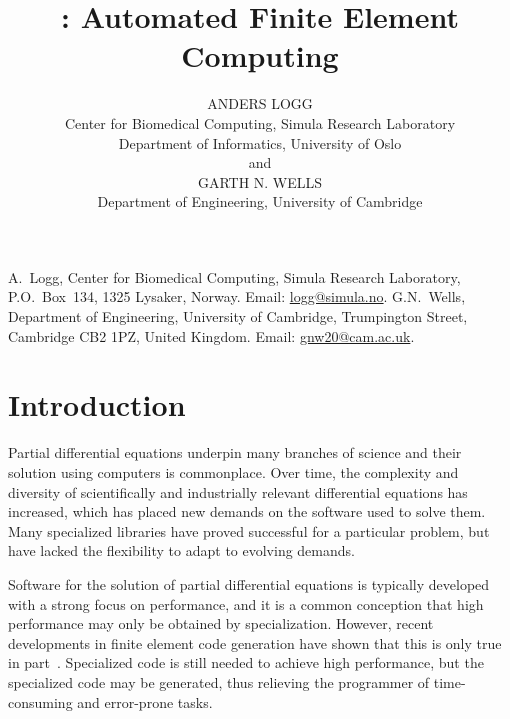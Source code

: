 \documentclass[acmtoms]{acmtrans2m}
\title{\dolfin{}: Automated Finite Element Computing}
\author{ANDERS LOGG \\
        Center for Biomedical Computing, Simula Research Laboratory \\
        Department of Informatics, University of Oslo \\
        and \\
        GARTH N. WELLS \\
        Department of Engineering, University of Cambridge}
\begin{document}
\begin{bottomstuff}
  A.~Logg,
  Center for Biomedical Computing,
  Simula Research Laboratory,
  P.O.~Box~134, 1325 Lysaker, Norway.
  Email: \url{logg@simula.no}.
  \newline
  G.N.~Wells, Department of Engineering, University of Cambridge,
  Trumpington Street, Cambridge CB2 1PZ, United Kingdom.
  Email: \url{gnw20@cam.ac.uk}.
\end{bottomstuff}

\maketitle

\section{Introduction}
\label{sec:introduction}

Partial differential equations underpin many branches of science and
their solution using computers is commonplace. Over time, the
complexity and diversity of scientifically and industrially relevant
differential equations has increased, which has placed new demands on
the software used to solve them. Many specialized libraries have
proved successful for a particular problem, but have lacked the
flexibility to adapt to evolving demands.

Software for the solution of partial differential equations is
typically developed with a strong focus on performance, and it is a
common conception that high performance may only be obtained by
specialization. However, recent developments in finite element code
generation have shown that this is only true in
part~\cite{kirby:2005,kirby:2006b,kirby:2006,logg:article:11}. Specialized
code is still needed to achieve high performance, but the specialized
code may be generated, thus relieving the programmer of time-consuming
and error-prone tasks.
\end{document}
